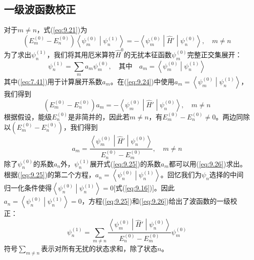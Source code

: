 \subsection*{一级波函数校正}

    对于$m \neq n$，式(\ref{eq:9.21})为
    \begin{equation}
        \left(E_m^{\left(0\right)} - E_n^{\left(0\right)}\right)\left\langle \psi_m^{\left(0\right)} \middle| \psi_n^{\left(1\right)} \right\rangle = - \left\langle \psi_m^{\left(0\right)} \middle| \hat{H}' \middle| \psi_n^{\left(0\right)} \right\rangle, \quad m \neq n
        \label{eq:9.24}
    \end{equation}
    为了求出$\psi_n^{\left(1\right)}$，我们将其用厄米算符$\hat{H}^0$的无扰本征函数$\psi_m^{\left(0\right)}$完整正交集展开：
    \begin{equation}
        \psi_n^{\left(1\right)} = \sum_{m} a_m \psi_m^{\left(0\right)}, \quad \text{其中} \quad a_m = \left\langle \psi_m^{\left(0\right)} \middle| \psi_n^{\left(1\right)} \right\rangle
        \label{eq:9.25}
    \end{equation}
    其中(\ref{eq:7.41})用于计算展开系数$a_m$。在(\ref{eq:9.24})中使用$a_m = \left\langle \psi_m^{\left(0\right)} \middle| \psi_n^{\left(1\right)} \right\rangle$，我们得到
    \begin{equation*}
        \left(E_m^{\left(0\right)} - E_n^{\left(0\right)}\right)a_m = - \left\langle \psi_m^{\left(0\right)} \middle| \hat{H}' \middle| \psi_n^{\left(0\right)} \right\rangle, \quad m \neq n
    \end{equation*}
    根据假设，能级$E_n^{\left(0\right)}$是非简并的，因此若$m \neq n$，有$E_m^{\left(0\right)} - E_n^{\left(0\right)} \neq 0$。两边同除以$\left(E_m^{\left(0\right)} - E_n^{\left(0\right)}\right)$，我们得到
    \begin{equation}
        a_m = \frac{\left\langle \psi_m^{\left(0\right)} \middle| \hat{H}' \middle| \psi_n^{\left(0\right)} \right\rangle}{E_n^{\left(0\right)} - E_m^{\left(0\right)}}, \quad m \neq n
        \label{eq:9.26}
    \end{equation}
    除了$\psi_n^{\left(0\right)}$的系数$a_n$外，$\psi_n^{\left(1\right)}$展开式(\ref{eq:9.25})的系数$a_m$都可以用(\ref{eq:9.26})求出。根据(\ref{eq:9.25})的第二个方程，$a_n = \left\langle \psi_n^{\left(0\right)} \middle| \psi_n^{\left(1\right)} \right\rangle$。回忆我们为$\psi_n$选择的中间归一化条件使得$\left\langle \psi_n^{\left(0\right)} \middle| \psi_n^{\left(1\right)} \right\rangle = 0$[式(\ref{eq:9.16})]。因此$a_n = \left\langle \psi_n^{\left(0\right)} \middle| \psi_n^{\left(1\right)} \right\rangle = 0$，方程(\ref{eq:9.25})和(\ref{eq:9.26})给出了波函数的一级校正：
    \begin{equation}
        \psi_n^{\left(1\right)} = \sum_{m \neq n} \frac{\left\langle \psi_m^{\left(0\right)} \middle| \hat{H}' \middle| \psi_n^{\left(0\right)} \right\rangle}{E_n^{\left(0\right)} - E_m^{\left(0\right)}} \psi_m^{\left(0\right)}
        \label{eq:9.27}
    \end{equation}
    符号$\sum_{m \neq n}$表示对所有无扰的状态求和，除了状态$n$。

